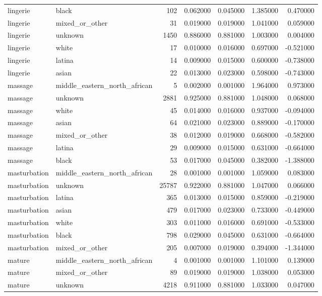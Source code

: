 \begin{tabular}{llrrrrr}
lingerie & black & 102 & 0.062000 & 0.045000 & 1.385000 & 0.470000 \\
lingerie & mixed_or_other & 31 & 0.019000 & 0.019000 & 1.041000 & 0.059000 \\
lingerie & unknown & 1450 & 0.886000 & 0.881000 & 1.003000 & 0.004000 \\
lingerie & white & 17 & 0.010000 & 0.016000 & 0.697000 & -0.521000 \\
lingerie & latina & 14 & 0.009000 & 0.015000 & 0.600000 & -0.738000 \\
lingerie & asian & 22 & 0.013000 & 0.023000 & 0.598000 & -0.743000 \\
massage & middle_eastern_north_african & 5 & 0.002000 & 0.001000 & 1.964000 & 0.973000 \\
massage & unknown & 2881 & 0.925000 & 0.881000 & 1.048000 & 0.068000 \\
massage & white & 45 & 0.014000 & 0.016000 & 0.937000 & -0.094000 \\
massage & asian & 64 & 0.021000 & 0.023000 & 0.889000 & -0.170000 \\
massage & mixed_or_other & 38 & 0.012000 & 0.019000 & 0.668000 & -0.582000 \\
massage & latina & 29 & 0.009000 & 0.015000 & 0.631000 & -0.664000 \\
massage & black & 53 & 0.017000 & 0.045000 & 0.382000 & -1.388000 \\
masturbation & middle_eastern_north_african & 28 & 0.001000 & 0.001000 & 1.059000 & 0.083000 \\
masturbation & unknown & 25787 & 0.922000 & 0.881000 & 1.047000 & 0.066000 \\
masturbation & latina & 365 & 0.013000 & 0.015000 & 0.859000 & -0.219000 \\
masturbation & asian & 479 & 0.017000 & 0.023000 & 0.733000 & -0.449000 \\
masturbation & white & 303 & 0.011000 & 0.016000 & 0.691000 & -0.533000 \\
masturbation & black & 798 & 0.029000 & 0.045000 & 0.631000 & -0.664000 \\
masturbation & mixed_or_other & 205 & 0.007000 & 0.019000 & 0.394000 & -1.344000 \\
mature & middle_eastern_north_african & 4 & 0.001000 & 0.001000 & 1.101000 & 0.139000 \\
mature & mixed_or_other & 89 & 0.019000 & 0.019000 & 1.038000 & 0.053000 \\
mature & unknown & 4218 & 0.911000 & 0.881000 & 1.033000 & 0.047000 \\

\end{tabular}
